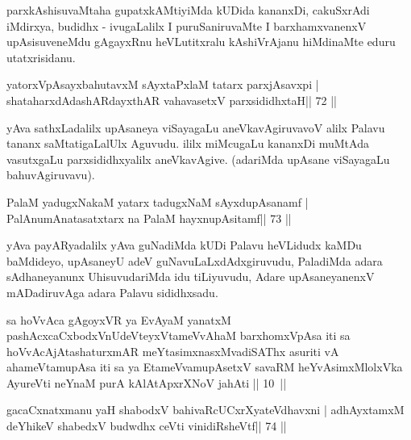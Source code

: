 \begin{artha}
parxkAshisuvaMtaha gupatxkAMtiyiMda kUDida kananxDi, cakuSxrAdi  iMdirxya, budidhx - ivugaLalilx I puruSaniruvaMte I barxhamxvanenxV upAsisuveneMdu gAgayxRnu heVLutitxralu kAshiVrAjanu hiMdinaMte eduru utatxrisidanu.
\end{artha}


\begin{shl}
yatorxVpAsayxbahutavxM sAyxtaPxlaM tatarx parxjAsavxpi |
shataharxdAdashARdayxthAR vahavasetxV parxsididhxtaH\hfill || 72 ||
\end{shl}

\begin{artha}
yAva sathxLadalilx upAsaneya viSayagaLu aneVkavAgiruvavoV alilx Palavu tananx saMtatigaLalUlx Aguvudu. ililx miMcugaLu kananxDi muMtAda vasutxgaLu parxsididhxyalilx aneVkavAgive. (adariMda upAsane viSayagaLu bahuvAgiruvavu).
\end{artha} 
 

\begin{shl}
PalaM yadugxNakaM yatarx tadugxNaM sAyxdupAsanamf |
PalAnumAnatasatxtarx na PalaM hayxnupAsitamf\hfill || 73 ||
\end{shl}

\begin{artha}
yAva payARyadalilx yAva guNadiMda kUDi Palavu heVLidudx kaMDu  baMdideyo, upAsaneyU adeV guNavuLaLxdAdxgiruvudu, PaladiMda adara  sAdhaneyanunx UhisuvudariMda idu tiLiyuvudu, Adare upAsaneyanenxV mADadiruvAga adara Palavu sididhxsadu.
\end{artha}


\begin{kandikeshl}
sa hoVvAca gAgoyxVR ya EvAyaM yanatxM pashAcxcaCxbodxV\s nUdeVteyxVtameVvAhaM barxhomxVpAsa iti sa hoVvAcAjAtashaturxmAR meYtasimxnasxMvadiSAThx asuriti vA ahameVtamupAsa iti sa ya EtameVvamupAsetxV savaRM heYvAsimxMlolxVka AyureVti neYnaM purA kAlAtApxrXNoV ja{hA}ti || 10~||
\end{kandikeshl}


\begin{shl}
gacaCxnatxmanu yaH shabodxV bahivaRcUCxrXyateV\s dhavxni |
adhAyxtamxM deYhikeV shabedxV budwdhx ceVti vinidiRsheVtf\hfill || 74 ||
\end{shl}

